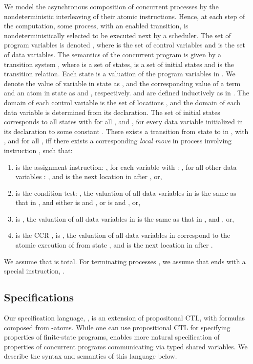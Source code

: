We model the asynchronous composition of concurrent processes by the
nondeterministic interleaving of their atomic instructions. Hence, at
each step of the computation, some process, with an enabled
transition, is nondeterministically selected to be executed next by a
scheduler. The set of program variables is denoted ,
where  is the set of control variables
and  is the set of data variables.
The semantics of the concurrent program  is given by a transition
system , where  is a set of states,  is
a set of initial states and  is the transition relation. Each state  is a valuation of the program variables in . We denote
the value of variable  in state  as , and the
corresponding value of a term  and an atom  in state  as
 and , respectively.  and 
are defined inductively as in . The domain of each
control variable  is the set of locations , and the
domain of each data variable is determined from its declaration.
The set of initial states  corresponds to all states 
with  for all , and , for every data variable  initialized in its declaration
to some constant .  There exists a transition 
from state  to  in , with ,  and 
for all , iff there exists a corresponding {\em local move} in
process  involving instruction , such that:
\begin{enumerate}
\item  is the
assignment instruction: , for each variable  with : 
, for all other data variables :
, and  is the next location in 
after , or, 
\item  is the condition test: , the valuation of all data variables in
 is the same as that in , and either  is  and
, or  is  and , or,
\item   is ,  the valuation of all data
variables in  is the same as that in , and , or, 
\item  is the CCR ,  is ,
the valuation of all data variables in  correspond to the atomic
execution of  from state , and  is the next
location in  after .  
\end{enumerate}

\noindent We assume that  is total. For terminating processes
, we assume that  ends with a special instruction,
.  

\subsection{Specifications}\label{sec:spec}

Our specification language, \vCTL, is an extension of propositonal
CTL, with formulas composed from -atoms.  While one can use
propositional CTL for specifying properties of finite-state programs,
\vCTL enables more natural specification of properties of concurrent
programs communicating via typed shared variables.  We describe the
syntax and semantics of this language below.  \\

